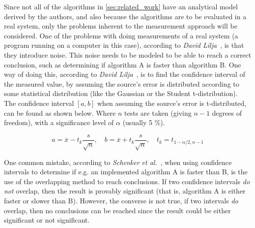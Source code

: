 Since not all of the algorithms in \cref{sec:related_work} have an analytical model derived by the authors, and also because the algorithms are to be evaluated in a real system, only the problems inherent to the measurement approach will be considered. One of the problems with doing measurements of a real system (a program running on a computer in this case), according to \emph{David Lilja}~\cite[p.~43]{lilja2005measuring}, is that they introduce noise. This noise needs to be modeled to be able to reach a correct conclusion, such as determining if algorithm A is faster than algorithm B. One way of doing this, according to \emph{David Lilja}~\cite[p.~48]{lilja2005measuring}, is to find the confidence interval of the measured value, by assuming the source's error is distributed according to some statistical distribution (like the Gaussian or the Student t-distribution). The confidence interval \([a,b]\) when assuming the source's error is t-distributed, can be found as shown below. Where \(n\) tests are taken (giving \(n-1\) degrees of freedom), with a significance level of \(\alpha\) (usually 5 \%).

\begin{equation} a = \overline{x} - t_k\frac{s}{\sqrt{n}}, \quad
   b = \overline{x} + t_k\frac{s}{\sqrt{n}}, \quad
t_k = t_{1-\alpha/2,n-1} \end{equation}

One common mistake, according to \emph{Schenker et al.}~\cite{schenker2001judging}, when using confidence intervals to determine if e.g. an implemented algorithm A is faster than B, is the use of the overlapping method to reach conclusions. If two confidence intervals \emph{do not} overlap, then the result is provably significant (that is, algorithm A is either faster or slower than B). However, the converse is not true, if two intervals \emph{do} overlap, then no conclusions can be reached since the result could be either significant or not significant.



